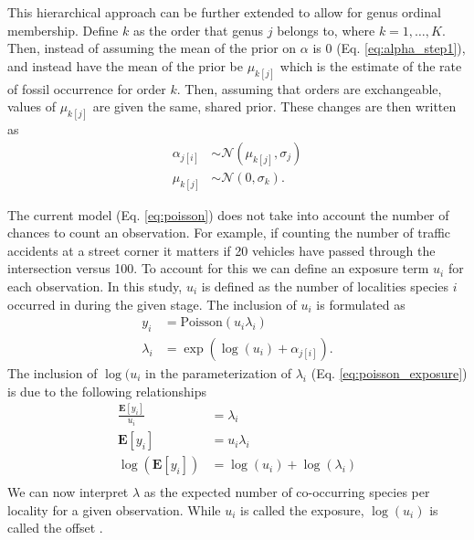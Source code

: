 \documentclass[12pt,letterpaper]{article}
\begin{document}
This hierarchical approach can be further extended to allow for genus ordinal membership. Define \(k\) as the order that genus \(j\) belongs to, where \(k = 1, \dots, K\). Then, instead of assuming the mean of the prior on \(\alpha\) is 0 (Eq. \ref{eq:alpha_step1}), and instead have the mean of the prior be \(\mu_{k[j]}\) which is the estimate of the rate of fossil occurrence for order \(k\). Then, assuming that orders are exchangeable, values of \(\mu_{k[j]}\) are given the same, shared prior. These changes are then written as
\begin{align}
  \alpha_{j[i]} &\sim \mathcal{N}(\mu_{k[j]}, \sigma_{j}) \nonumber \\
  \mu_{k[j]} &\sim \mathcal{N}(0, \sigma_{k}).
  \label{eq:alpha_step2}
\end{align}

The current model (Eq. \ref{eq:poisson}) does not take into account the number of chances to count an observation. For example, if counting the number of traffic accidents at a street corner it matters if 20 vehicles have passed through the intersection versus 100. To account for this we can define an exposure term \(u_{i}\) for each observation. In this study, \(u_{i}\) is defined as the number of localities species \(i\) occurred in during the given stage. The inclusion of \(u_{i}\) is formulated as 
\begin{align}
  y_{i} &= \mathrm{Poisson}(u_{i}\lambda_{i}) \nonumber\\
  \lambda_{i} &= \exp(\log(u_{i}) + \alpha_{j[i]}).
  \label{eq:poisson_exposure}
\end{align}
The inclusion of \(\log(u_{i}\) in the parameterization of \(\lambda_{i}\) (Eq. \ref{eq:poisson_exposure}) is due to the following relationships 
\begin{align*}
  \frac{\mathbf{E}[y_i]}{u_{i}} &= \lambda_{i} \\
  \mathbf{E}[y_{i}] &= u_{i}\lambda_{i} \\
  \log(\mathbf{E}[y_{i}]) &= \log(u_{i}) + \log(\lambda_{i}) \\
\end{align*}
We can now interpret \(\lambda\) as the expected number of co-occurring species per locality for a given observation. While \(u_{i}\) is called the exposure, \(\log(u_{i})\) is called the offset \citep{Gelman2007}. 
\end{document}
